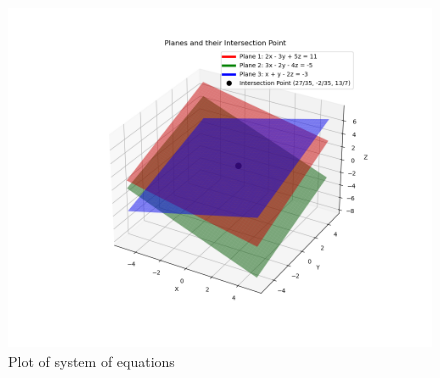 \documentclass[journal]{IEEEtran}
\begin{document}
\begin{figure}[h!]
   \centering
   \includegraphics[width=\linewidth]{figs/01.png}
   \caption{Plot of system of equations}
   \label{Plot_1}
\end{figure}
\end{document}
